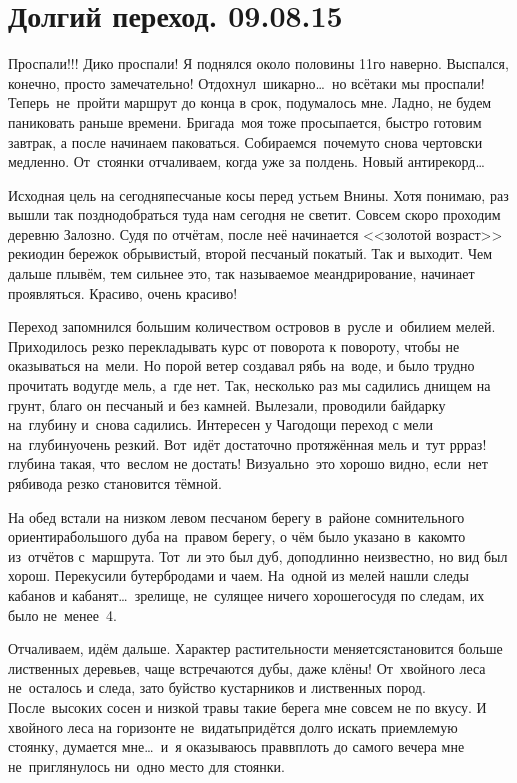 \chapter{Долгий переход. 09.08.15}

Проспали!!! Дико проспали! Я поднялся около половины 11\sdash го наверно. Выспался, конечно, просто замечательно! Отдохнул~шикарно\ldots~но всё\sdash таки мы проспали! Теперь~не~пройти маршрут до конца в срок, подумалось мне. Ладно, не будем паниковать раньше времени. Бригада~моя тоже просыпается, быстро готовим завтрак, а после начинаем паковаться. Собираемся~почему\sdash то снова чертовски медленно. От~стоянки отчаливаем, когда уже за полдень. Новый антирекорд\ldots~

Исходная цель на сегодня\mdash песчаные косы перед устьем Внины. Хотя понимаю, раз вышли так поздно\mdash добраться туда нам сегодня не светит. Совсем скоро проходим деревню Залозно. Судя по отчётам, после неё начинается <<золотой возраст>> реки\mdash один бережок обрывистый, второй песчаный покатый. Так и выходит. Чем дальше плывём, тем сильнее это, так называемое меандрирование, начинает проявляться. Красиво, очень красиво! 

Переход запомнился большим количеством островов в~русле и~обилием мелей. Приходилось резко перекладывать курс от поворота к повороту, чтобы не оказываться на~мели. Но порой ветер создавал рябь на~воде, и было трудно прочитать воду\mdash где мель, а~где нет. Так, несколько раз мы садились днищем на грунт, благо он песчаный и без камней. Вылезали, проводили байдарку на~глубину и~снова садились. Интересен у Чагодощи переход с мели на~глубину\mdash очень резкий. Вот~идёт достаточно протяжённая мель и~тут р\sdash р\sdash раз!\mdash глубина такая, что~веслом не достать! Визуально~это хорошо видно, если~нет ряби\mdash вода резко становится тёмной.

На обед встали на низком левом песчаном берегу в~районе сомнительного ориентира\mdash большого дуба на~правом берегу, о чём было указано в~каком\sdash то из~отчётов с~маршрута. Тот~ли это был дуб, доподлинно неизвестно, но вид был хорош. Перекусили бутербродами и чаем. На~одной из мелей нашли следы кабанов и кабанят\ldots~зрелище, не~сулящее ничего хорошего\mdash судя по следам, их было не~менее~4. 

Отчаливаем, идём дальше. Характер растительности меняется\mdash становится больше лиственных деревьев, чаще встречаются дубы, даже клёны! От~хвойного леса не~осталось и следа, зато буйство кустарников и лиственных пород. После~высоких сосен и низкой травы такие берега мне совсем не по вкусу. И хвойного леса на горизонте не~видать\mdash придётся долго искать приемлемую стоянку, думается мне\ldots~и~я оказываюсь прав\mdash вплоть до самого вечера мне не~приглянулось ни~одно место для стоянки.

